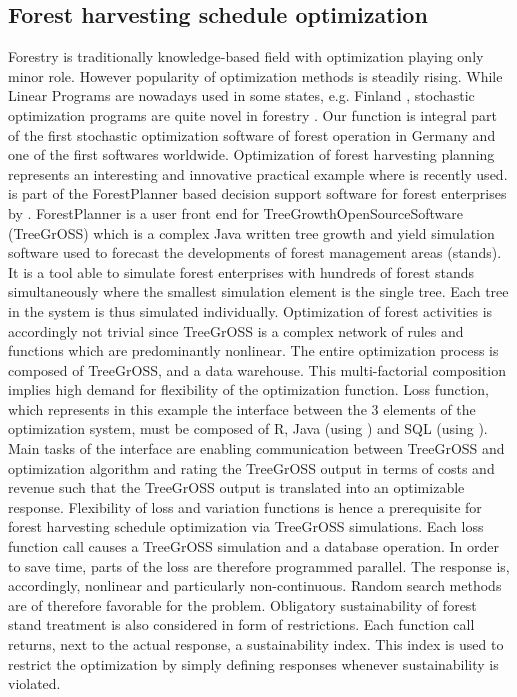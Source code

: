 \subsection{Forest harvesting schedule optimization}
Forestry is traditionally knowledge-based field with optimization playing only minor role. However popularity of optimization methods is steadily rising. While Linear Programs are nowadays used in some states, e.g. Finland \citep{redsven_2012}, stochastic optimization programs are quite novel in forestry \citep{kangas_2015}. Our function is integral part of the first stochastic optimization software of forest operation in Germany and one of the first softwares worldwide. Optimization of forest harvesting planning represents an interesting and innovative practical example where  is recently used.  is part of the ForestPlanner based decision support software for forest enterprises by \citet{hansen_2014}. ForestPlanner is a user front end for TreeGrowthOpenSourceSoftware (TreeGrOSS) which is a complex Java written tree growth and yield simulation software used to forecast the developments of forest management areas (stands). It is a tool able to simulate forest enterprises with hundreds of forest stands simultaneously where the smallest simulation element is the single tree. Each tree in the system is thus simulated individually. Optimization of forest activities is accordingly not trivial since TreeGrOSS is a complex network of rules and functions which are predominantly nonlinear. The entire optimization process is composed of TreeGrOSS,  and a data warehouse. This multi-factorial composition implies high demand for flexibility of the optimization function. Loss function, which represents in this example the interface between the 3 elements of the optimization system, must be composed of R, Java (using ) and SQL (using ). Main tasks of the interface are enabling communication between TreeGrOSS and optimization algorithm and rating the TreeGrOSS output in terms of costs and revenue such that the TreeGrOSS output is translated into an optimizable response. Flexibility of loss and variation functions is hence a prerequisite for forest harvesting schedule optimization via TreeGrOSS simulations. Each loss function call causes a TreeGrOSS simulation and a database operation. In order to save time, parts of the loss are therefore programmed parallel. The response is, accordingly, nonlinear and particularly non-continuous. Random search methods are of therefore favorable for the problem. Obligatory sustainability of forest stand treatment is also considered in form of restrictions. Each function call returns, next to the actual response, a sustainability index. This index is used to restrict the optimization by simply defining  responses whenever sustainability is violated.

